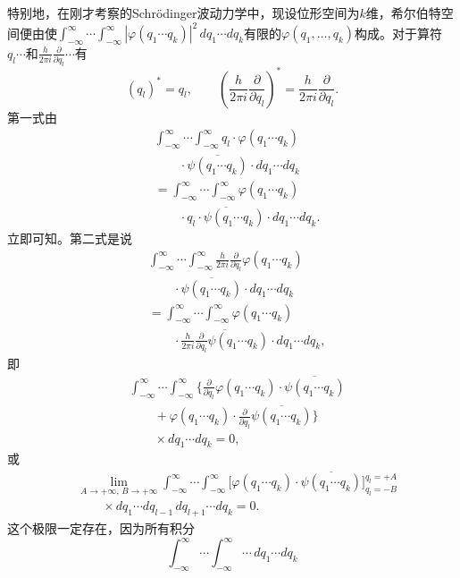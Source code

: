 \documentclass[fontsize=13pt,twoside,openany,headings=normal,parskip=false,bookmarkpackage=false,DIV=calc]{scrbook}
\begin{document}
\hypertarget{origpage-49}{}\label{origpage-49}特别地，在刚才考察的Schr\"odinger波动力学中，现设位形空间为$k$维，希尔伯特空间便由使$\int_{-\infty}^{\infty}\cdots\int_{-\infty}^{\infty}|\varphi(q_1\cdots q_k)|^2\,dq_1\cdots dq_k$有限的$\varphi(q_1,\allowbreak \ldots,\allowbreak q_k)$构成。对于算符$q_l\cdots$和$\frac{h}{2\pi i}\frac{\partial}{\partial q_l}\cdots$有
\[
(q_l)^*=q_l,\qquad
\left(\frac{h}{2\pi i}\frac{\partial}{\partial q_l}\right)^*
=\frac{h}{2\pi i}\frac{\partial}{\partial q_l}.
\]
第一式由
\begin{align*}
&\int_{-\infty}^{\infty}\cdots\int_{-\infty}^{\infty}q_l\cdot\varphi(q_1\cdots q_k)\\
&\qquad\cdot\overline{\psi(q_1\cdots q_k)}\cdot dq_1\cdots dq_k\\
&=\int_{-\infty}^{\infty}\cdots\int_{-\infty}^{\infty}\varphi(q_1\cdots q_k)\\
&\qquad\cdot\overline{q_l\cdot\psi(q_1\cdots q_k)}\cdot dq_1\cdots dq_k.
\end{align*}
立即可知。第二式是说
\begin{align*}
&\int_{-\infty}^{\infty}\cdots\int_{-\infty}^{\infty}\frac{h}{2\pi i}\frac{\partial}{\partial q_l}\varphi(q_1\cdots q_k)\\
&\qquad\cdot\overline{\psi(q_1\cdots q_k)}\cdot dq_1\cdots dq_k\\
&=\int_{-\infty}^{\infty}\cdots\int_{-\infty}^{\infty}\varphi(q_1\cdots q_k)\\
&\qquad\cdot\overline{\frac{h}{2\pi i}\frac{\partial}{\partial q_l}\psi(q_1\cdots q_k)}\cdot dq_1\cdots dq_k,
\end{align*}
即
\begin{align*}
&\int_{-\infty}^{\infty}\cdots\int_{-\infty}^{\infty}
\biggl\{\frac{\partial}{\partial q_l}\varphi(q_1\cdots q_k)\cdot\overline{\psi(q_1\cdots q_k)}\\
&\qquad+\varphi(q_1\cdots q_k)\cdot\frac{\partial}{\partial q_l}\overline{\psi(q_1\cdots q_k)}\biggr\}\\
&\qquad\times dq_1\cdots dq_k=0,
\end{align*}
或
\begin{align*}
&\lim_{A\to+\infty,\,B\to+\infty}
\int_{-\infty}^{\infty}\cdots\int_{-\infty}^{\infty}
\bigl[\varphi(q_1\cdots q_k)\cdot\overline{\psi(q_1\cdots q_k)}\bigr]_{q_l=-B}^{q_l=+A}\\
&\qquad\times dq_1\cdots dq_{l-1}\,dq_{l+1}\cdots dq_k=0.
\end{align*}
这个极限一定存在，因为所有积分
\[
\int_{-\infty}^{\infty}\cdots\int_{-\infty}^{\infty}\cdots\,dq_1\cdots dq_k
\]
\end{document}
